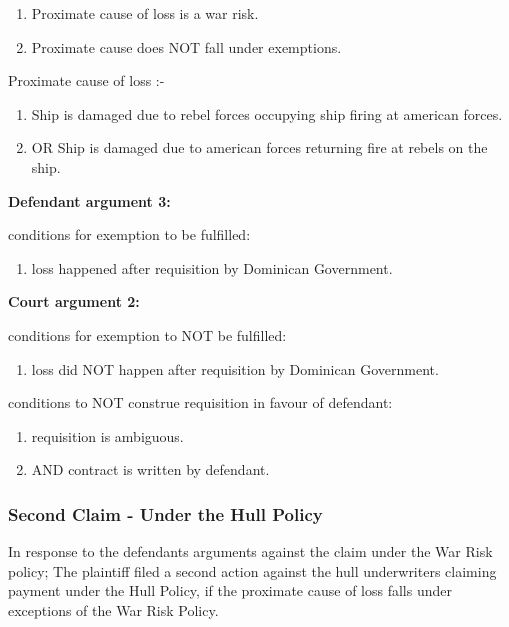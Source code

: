      \begin{enumerate}
        \item Proximate cause of loss is a war risk.
        \item Proximate cause does NOT fall under exemptions.
     \end{enumerate}
                
     Proximate cause of loss :-
     
     \begin{enumerate}
        \item Ship is damaged due to rebel forces occupying ship firing at american forces.
        \item OR Ship is damaged due to american forces returning fire at rebels on the ship.
     \end{enumerate}
                
     \textbf{Defendant argument 3:}
     
     conditions for exemption to be fulfilled:
         \begin{enumerate}
             \item loss happened after requisition by Dominican Government.
         \end{enumerate}
     
     
    \textbf{Court argument 2:}
    
     conditions for exemption to NOT be fulfilled:
         \begin{enumerate}
             \item loss did NOT happen after requisition by Dominican Government.
         \end{enumerate}
     
     conditions to NOT construe requisition in favour of defendant:
         \begin{enumerate}
             \item requisition is ambiguous.
             \item AND contract is written by defendant.
         \end{enumerate}
     
    
\subsubsection{Second Claim - Under the Hull Policy}

    In response to the defendants arguments against the claim under the War Risk policy; The plaintiff filed a second action against the hull underwriters claiming payment under the Hull Policy, if the proximate cause of loss falls under exceptions of the War Risk Policy.
    
